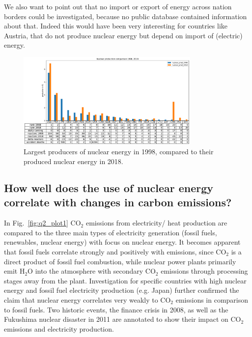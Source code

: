 \documentclass[a4paper,10pt,twocolumn]{scrartcl}
\begin{document}
We also want to point out that no import or export of energy across nation borders could be investigated, because no public database contained information about that. Indeed this would have been very interesting for countries like Austria, that do not produce nuclear energy but depend on import of (electric) energy.

\begin{figure}[t]
	\centering
	\includegraphics[width=0.8\textwidth]{../figures/q1_plot2.pdf}
	\caption{Largest producers of nuclear energy in 1998, compared to their produced nuclear energy in 2018.}
	\label{fig:q2_plot2}
\end{figure}

\subsection{How well does the use of nuclear energy correlate with changes in carbon emissions?}
In Fig.~\ref{fig:q2_plot1} CO$_2$ emissions from electricity/ heat production are compared to the three main types of electricity generation (fossil fuels, renewables, nuclear energy) with focus on nuclear energy. It becomes apparent that fossil fuels correlate strongly and positively with emissions, since CO$_2$ is a direct product of fossil fuel combustion, while nuclear power plants primarily emit H$_2$O into the atmosphere with secondary CO$_2$ emissions through processing stages away from the plant. Investigation for specific countries with high nuclear energy and fossil fuel electricity production (e.g. Japan) further confirmed the claim that nuclear energy correlates very weakly to CO$_2$ emissions in comparison to fossil fuels. Two historic events, the finance crisis in 2008, as well as the Fukushima nuclear disaster in 2011 are annotated to show their impact on CO$_2$ emissions and electricity production.
\end{document}
